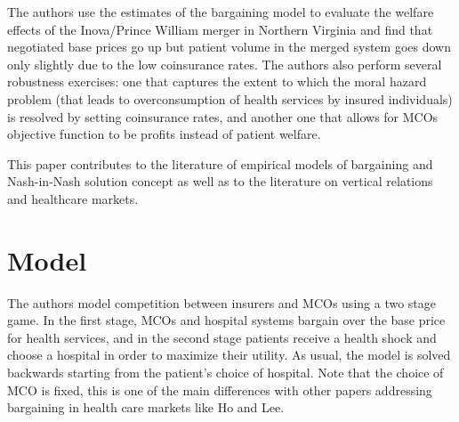\documentclass[12pt,english]{article}
\begin{document}
The authors use the estimates of the bargaining model to evaluate the welfare effects of the Inova/Prince William merger in Northern Virginia and find that negotiated base prices go up but patient volume in the merged system goes down only slightly due to the low coinsurance rates. The authors also perform several robustness exercises: one that captures the extent to which the moral hazard problem (that leads to overconsumption of health services by insured individuals) is resolved by setting coinsurance rates, and another one that allows for MCOs objective function to be profits instead of patient welfare. 

This paper contributes to the literature of empirical models of bargaining and Nash-in-Nash solution concept as well as to the literature on vertical relations and healthcare markets. 

\section{Model}

The authors model competition between insurers and MCOs using a two stage game. In the first stage, MCOs and hospital systems bargain over the base price for health services, and in the second stage patients receive a health shock and choose a hospital in order to maximize their utility. As usual, the model is solved backwards starting from the patient's choice of hospital. Note that the choice of MCO is fixed, this is one of the main differences with other papers addressing bargaining in health care markets like Ho and Lee. 
\end{document}
